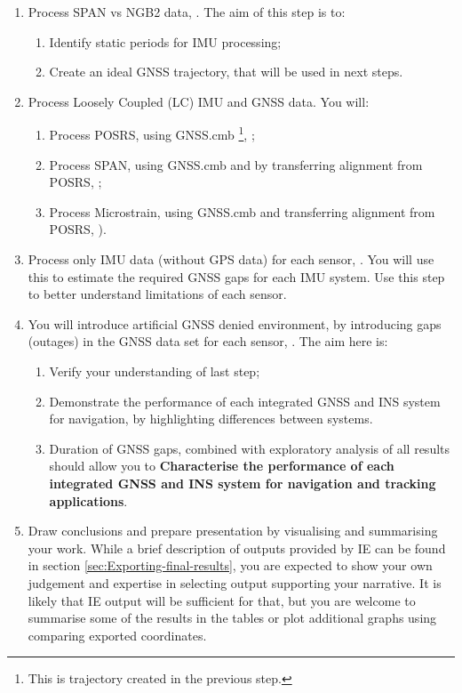 \documentclass[11pt,fleqn]{book} %
\begin{document}
\begin{enumerate}
	\item Process SPAN vs NGB2 data, . The aim of this step is to: 
	\begin{enumerate}
		\item Identify static periods for IMU processing;
		\item Create an ideal GNSS trajectory, that will be used in next steps.
	\end{enumerate}
	\item Process Loosely Coupled (LC) IMU and GNSS data. You will:
	\begin{enumerate}
		\item Process POSRS, using GNSS.cmb \footnote{This is trajectory created in the previous step.}, ;
		\item Process SPAN, using GNSS.cmb and by transferring alignment from POSRS, ;
		\item Process Microstrain, using GNSS.cmb and transferring alignment from POSRS, ).
	\end{enumerate}
	\item Process only IMU data (without GPS data) for each sensor, . You will use this to estimate the required GNSS gaps for each IMU system. Use this step to better understand limitations of each sensor. 
	\item You will introduce artificial GNSS denied environment, by introducing gaps (outages) in the GNSS data set for each sensor, . The aim here is: 
	\begin{enumerate}
	\item Verify your understanding of last step;
	\item Demonstrate the performance of each integrated GNSS and INS system for navigation, by highlighting differences between systems.
	\item Duration of GNSS gaps, combined with exploratory analysis of all results should allow you to \textbf{Characterise the performance of each integrated GNSS and INS system for navigation and tracking applications}.
	\end{enumerate}
	\item Draw conclusions and prepare presentation by visualising and summarising your work. While a brief description of outputs provided by IE can be found in section \ref{sec:Exporting-final-results}, you are expected to show your own judgement and expertise in selecting output supporting your narrative. It is likely that IE output will be sufficient for that, but you are welcome to summarise some of the results in the tables or plot additional graphs using comparing exported coordinates.
\end{enumerate}
\end{document}
